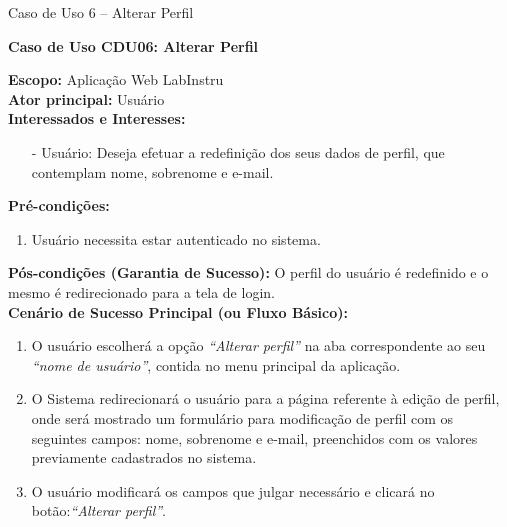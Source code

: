 	\begin{quadro}[h!]\caption{Caso de Uso 6 -- Alterar Perfil}
	\hfill
	\end{quadro}
	\begin{mdframed}

		\textbf{Caso de Uso CDU06: Alterar Perfil}\\

		\begin{flushleft}

		\textbf{Escopo:} Aplicação Web LabInstru\\

		\textbf{Ator principal:} Usuário\\

		\textbf{Interessados e Interesses:}
		\begin{itemize}
			\item[-] Usuário: Deseja efetuar a redefinição dos seus dados de perfil, que contemplam nome, sobrenome e e-mail.
		\end{itemize}

		\textbf{Pré-condições:}\\
			 \begin{enumerate}
			 	\item{Usuário necessita estar autenticado no sistema.}
			 \end{enumerate}

		\textbf{Pós-condições (Garantia de Sucesso):} O perfil do usuário é redefinido e o mesmo é redirecionado para a tela de login.\\

		\textbf{Cenário de Sucesso Principal (ou Fluxo Básico):}\\
			\begin{enumerate}
			 	\item{O usuário escolherá a opção \textit{``Alterar perfil''} na aba correspondente ao seu \textit{``nome de usuário''}, contida no menu principal da aplicação.}
			 	\item{O Sistema redirecionará o usuário para a página referente à edição de perfil, onde será mostrado um formulário para modificação de perfil com os seguintes campos: nome, sobrenome e e-mail, preenchidos com os valores previamente cadastrados no sistema.}
			 	\item{O usuário modificará os campos que julgar necessário e clicará no botão:\textit{``Alterar perfil''}.}
			 \end{enumerate}


\end{flushleft}
\end{mdframed}
